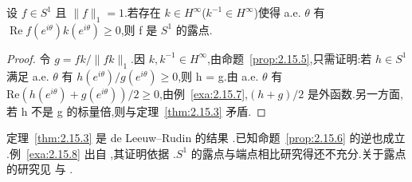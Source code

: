 \begin{example}\label{exa:2.15.8}
设 $f \in S^{1}$ 且 $\|f\|_{1} = 1$.若存在 $k \in H^{\infty}$($k^{-1} \in H^{\infty}$)使得 a.e. $\theta$ 有 $\operatorname{Re} f(e^{i\theta})k(e^{i\theta}) \geq 0$,则 f 是 $S^{1}$ 的露点.
\end{example}

\begin{proof}
令 $g = fk/\|fk\|_{1}$.因 $k, k^{-1} \in H^{\infty}$,由命题~\ref{prop:2.15.5},只需证明:若 $h \in S^{1}$ 满足 a.e. $\theta$ 有 $h(e^{i\theta})/g(e^{i\theta}) \geq 0$,则 h = g.由 a.e. $\theta$ 有 $\mathrm{Re}(h(e^{i\theta}) + g(e^{i\theta}))/2 \geq 0$,由例~\ref{exa:2.15.7},$(h + g)/2$ 是外函数.另一方面,若 h 不是 g 的标量倍,则与定理~\ref{thm:2.15.3} 矛盾.
\end{proof}

定理~\ref{thm:2.15.3} 是 de Leeuw--Rudin 的结果 \cite{ch2:5}.已知命题~\ref{prop:2.15.6} 的逆也成立 \cite{ch2:6}.例~\ref{exa:2.15.8} 出自 \cite{ch2:7},其证明依据 \cite{ch2:8}.$S^{1}$ 的露点与端点相比研究得还不充分.关于露点的研究见 \cite{ch2:9} 与 \cite{ch2:10}.
